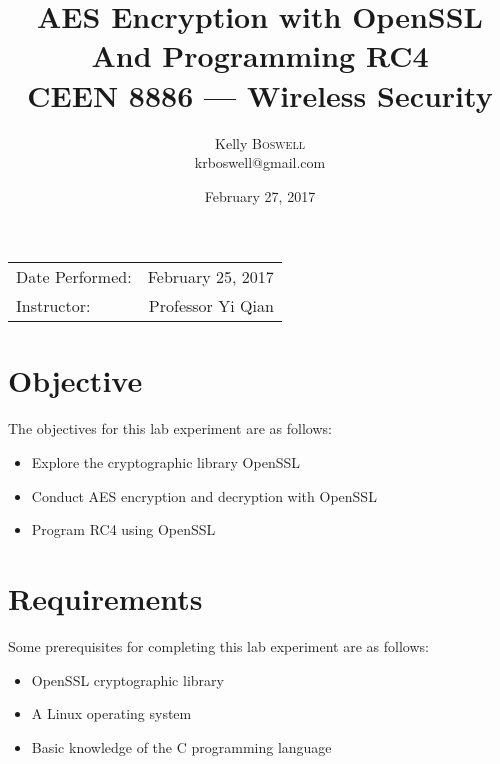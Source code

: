 \documentclass{article}
\title{AES Encryption with OpenSSL \\ And Programming RC4 \\ CEEN 8886 --- Wireless Security} %
\author{Kelly \textsc{Boswell} \\ krboswell@gmail.com} %
\date{\Large February 27, 2017} %
\begin{document}
\maketitle %

\begin{center}
\begin{tabular}{l r}
Date Performed: & February 25, 2017 \\ %
Instructor: & Professor Yi Qian %
\end{tabular}
\end{center}



\section{Objective}

The objectives for this lab experiment are as follows:

\begin{itemize}
\item Explore the cryptographic library OpenSSL
\item Conduct AES encryption and decryption with OpenSSL
\item Program RC4 using OpenSSL
\end{itemize}


\section{Requirements}

Some prerequisites for completing this lab experiment are as follows:

\begin{itemize}
\item OpenSSL cryptographic library
\item A Linux operating system
\item Basic knowledge of the C programming language
\end{itemize}
\end{document}
